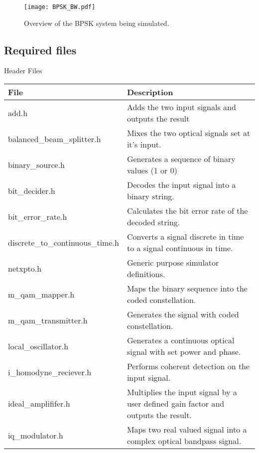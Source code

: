 \begin{figure}[h]
\centering
\texttt{[image: BPSK\_BW.pdf]}
\caption{Overview of the BPSK system being simulated.}
\label{fig:homodynesystem}
\end{figure}

\subsection*{Required files}\label{Required files}

Header Files

\begin{table}[H]
\centering
\begin{tabulary}{1.0\textwidth}{|L|L|}
\hline
\textbf{File}              & \textbf{Description} 				                  \\ \hline
add.h                      & Adds the two input signals and outputs the result    \\ \hline
balanced\_beam\_splitter.h & Mixes the two optical signals set at it's input.     \\ \hline
binary\_source.h           & Generates a sequence of binary values (1 or 0)       \\ \hline
bit\_decider.h             & Decodes the input signal into a binary string.       \\ \hline
bit\_error\_rate.h         & Calculates the bit error rate of the decoded string. \\ \hline
discrete\_to\_continuous\_time.h &  Converts a signal discrete in time to a signal continuous in time. \\ \hline
netxpto.h                  & Generic purpose simulator definitions.	              \\ \hline
m\_qam\_mapper.h           & Maps the binary sequence into the coded constellation. \\ \hline
m\_qam\_transmitter.h      & Generates the signal with coded constellation.       \\ \hline
local\_oscillator.h        & Generates a continuous optical signal with set power and phase. \\ \hline
i\_homodyne\_reciever.h    & Performs coherent detection on the input signal.     \\ \hline
ideal\_amplififer.h        & Multiplies the input signal by a user defined gain factor and outputs the result. \\ \hline
iq\_modulator.h            & Maps two real valued signal into a complex optical bandpass  signal. \\ \hline

\end{tabulary}
\end{table}
